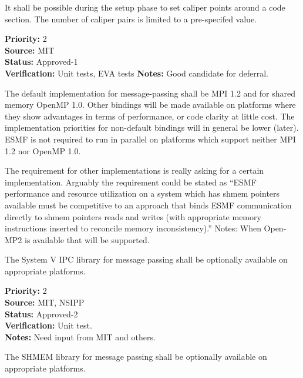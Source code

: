
It shall be possible during the setup phase to set caliper points
around a code section.  The number of
caliper pairs is limited to a pre-specifed value.

\begin{reqlist}
{\bf Priority:} 2 \\
{\bf Source:}  MIT \\
{\bf Status:} Approved-1 \\
{\bf Verification:} Unit tests, EVA tests 
{\bf Notes:} Good candidate for deferral.
\end{reqlist}



The default implementation for message-passing shall be MPI 1.2 and for
shared memory OpenMP 1.0.  Other bindings will be made available on
platforms where they show advantages in terms of performance, or code
clarity at little cost. The implementation priorities for non-default
bindings will in general be lower (later). ESMF is not required to run
in parallel on platforms which support neither MPI 1.2 nor OpenMP 1.0.

The requirement for other implementations is really asking for a certain
implementation. Arguably the requirement could be stated as ``ESMF
performance and resource utilization on a system which has shmem
pointers available must be competitive to an approach that binds ESMF
communication directly to shmem pointers reads and writes (with
appropriate memory instructions inserted to reconcile memory
inconsistency).''
Notes:  When Open-MP2 is available that will be supported.


The System V IPC library for message passing shall be optionally
available on appropriate platforms.

\begin{reqlist}
{\bf Priority:} 2 \\
{\bf Source:}  MIT, NSIPP \\
{\bf Status:} Approved-2 \\
{\bf Verification:} Unit test. \\
{\bf Notes:} Need input from MIT and others.
\end{reqlist}


The SHMEM library for message passing shall be optionally
available on appropriate platforms.

